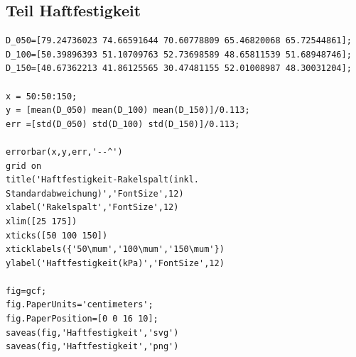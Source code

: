 \documentclass[12pt,UTF8]{article}
\begin{document}
\subsection{Teil Haftfestigkeit}
\begin{lstlisting}
D_050=[79.24736023 74.66591644 70.60778809 65.46820068 65.72544861];
D_100=[50.39896393 51.10709763 52.73698589 48.65811539 51.68948746];
D_150=[40.67362213 41.86125565 30.47481155 52.01008987 48.30031204];

x = 50:50:150;
y = [mean(D_050) mean(D_100) mean(D_150)]/0.113;
err =[std(D_050) std(D_100) std(D_150)]/0.113;

errorbar(x,y,err,'--^')
grid on
title('Haftfestigkeit-Rakelspalt(inkl. Standardabweichung)','FontSize',12)
xlabel('Rakelspalt','FontSize',12)
xlim([25 175])
xticks([50 100 150])
xticklabels({'50\mum','100\mum','150\mum'})
ylabel('Haftfestigkeit(kPa)','FontSize',12)

fig=gcf;
fig.PaperUnits='centimeters';
fig.PaperPosition=[0 0 16 10];
saveas(fig,'Haftfestigkeit','svg')
saveas(fig,'Haftfestigkeit','png')
\end{lstlisting}
\end{document}
